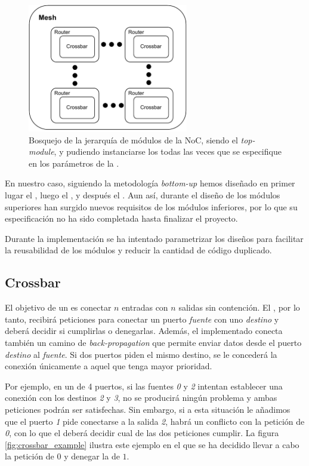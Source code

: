 \begin{figure}[h]
    \centering
    \includegraphics[width=7cm]{images/diagrams/bottom-up.pdf}
    \caption[Diagrama de la jerarquía de módulos de la NoC]{Bosquejo de la jerarquía de módulos de la NoC, siendo  el \textit{top-module}, y pudiendo instanciarse los  todas las veces que se especifique en los parámetros de la .}
    \label{fig:sketch_modules}
\end{figure}

En nuestro caso, siguiendo la metodología \textit{bottom-up} hemos diseñado en primer lugar el , luego el , y después el . Aun así, durante el diseño de los módulos superiores han surgido nuevos requisitos de los módulos inferiores, por lo que su especificación no ha sido completada hasta finalizar el proyecto.

Durante la implementación se ha intentado parametrizar los diseños para facilitar la reusabilidad de los módulos y reducir la cantidad de código duplicado.

\subsection{Crossbar}

El objetivo de un  es conectar $n$ entradas con $n$ salidas sin contención. El , por lo tanto, recibirá peticiones para conectar un puerto \textit{fuente} con uno \textit{destino} y deberá decidir si cumplirlas o denegarlas. Además, el  implementado conecta también un camino de \textit{back-propagation} que permite enviar datos desde el puerto \textit{destino} al \textit{fuente}. Si dos puertos piden el mismo destino, se le concederá la conexión únicamente a aquel que tenga mayor prioridad.

Por ejemplo, en un  de 4 puertos, si las fuentes \textit{0} y \textit{2} intentan establecer una conexión con los destinos \textit{2} y \textit{3}, no se producirá ningún problema y ambas peticiones podrán ser satisfechas. Sin embargo, si a esta situación le añadimos que el puerto \textit{1} pide conectarse a la salida \textit{2}, habrá un conflicto con la petición de \textit{0}, con lo que el  deberá decidir cual de las dos peticiones cumplir. La figura \ref{fig:crossbar_example} ilustra este ejemplo en el que se ha decidido llevar a cabo la petición de $0$ y denegar la de $1$.

